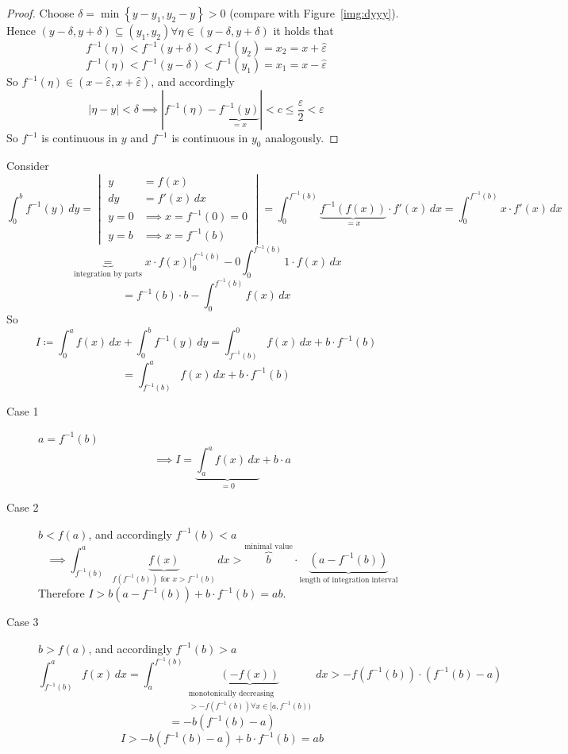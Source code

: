 \documentclass{article}
\newcommand{\set}[1]{\left\{#1\right\}}
\newcommand{\card}[1]{\left|#1\right|}
\begin{document}
\begin{proof}
  Choose $\delta = \min\set{y - y_1, y_2 - y} > 0$ (compare with Figure~\ref{img:dyyy}).
  Hence $(y - \delta, y + \delta) \subseteq (y_1, y_2) \forall \eta \in (y - \delta, y + \delta)$ it holds that
  \[ f^{-1}(\eta) < f^{-1}(y + \delta) < f^{-1}(y_2) = x_2 = x + \hat\varepsilon \]
  \[ f^{-1}(\eta) < f^{-1}(y - \delta) < f^{-1}(y_1) = x_1 = x - \hat\varepsilon \]
  So $f^{-1}(\eta) \in (x - \hat{\varepsilon}, x + \hat{\varepsilon})$, and accordingly
  \[ \card{\eta - y} < \delta \implies \card{f^{-1}(\eta) - \underbrace{f^{-1}(y)}_{=x}} < c \leq \frac{\varepsilon}{2} < \varepsilon \]
  So $f^{-1}$ is continuous in $y$ and $f^{-1}$ is continuous in $y_0$ analogously.
\end{proof}

Consider
\[
  \int_0^b f^{-1}(y) \, dy = \begin{vmatrix}
    y &= f(x) \\
    dy &= f'(x) \, dx \\
    y = 0 &\implies x = f^{-1}(0) = 0 \\
    y = b &\implies x = f^{-1}(b)
  \end{vmatrix}
  = \int_0^{f^{-1}(b)} \underbrace{f^{-1}(f(x))}_{=x} \cdot f'(x) \, dx = \int_0^{f^{-1}(b)} x \cdot f'(x) \, dx
\] \[
  \underbrace{=}_{\text{integration by parts}}
  \left. x \cdot f(x) \right|_0^{f^{-1}(b)} - 0 \int_0^{f^{-1}(b)} 1 \cdot f(x) \, dx
\] \[
  = f^{-1}(b) \cdot b - \int_0^{f^{-1}(b)} f(x) \, dx
\]
So
\[
  I \coloneqq \int_0^a f(x) \, dx + \int_0^b f^{-1}(y) \, dy = \int_{f^{-1}(b)}^0 f(x) \, dx + b \cdot f^{-1}(b)
\] \[
  = \int_{f^{-1}(b)}^a f(x) \, dx + b \cdot f^{-1}(b)
\]

\begin{description}
  \item[Case 1] $a = f^{-1}(b)$
    \[ \implies I = \underbrace{\int_a^a f(x) \, dx}_{=0} + b \cdot a \]
  \item[Case 2] $b < f(a)$, and accordingly $f^{-1}(b) < a$
    \[ \implies \int_{f^{-1}(b)}^a \underbrace{f(x)}_{f(f^{-1}(b)) \text{ for } x > f^{-1}(b)} \, dx > \overbrace{b}^{\text{minimal value}} \cdot \underbrace{(a - f^{-1}(b))}_{\text{length of integration interval}}  \]
    Therefore $I > b(a - f^{-1}(b)) + b \cdot f^{-1}(b) = ab$.
  \item[Case 3] $b > f(a)$, and accordingly $f^{-1}(b) > a$
    \[ \int_{f^{-1}(b)}^a f(x) \, dx = \int_a^{f^{-1}(b)} \underbrace{(-f(x))}_{\substack{\text{monotonically decreasing} \\ > -f(f^{-1}(b)) \forall x \in [a,f^{-1}(b))}} \, dx > -f(f^{-1}(b)) \cdot (f^{-1}(b) - a) \]
    \[ = -b(f^{-1}(b) - a) \]
    \[ I > -b (f^{-1}(b) - a) + b \cdot f^{-1}(b) = ab \]
\end{description}
\end{document}
